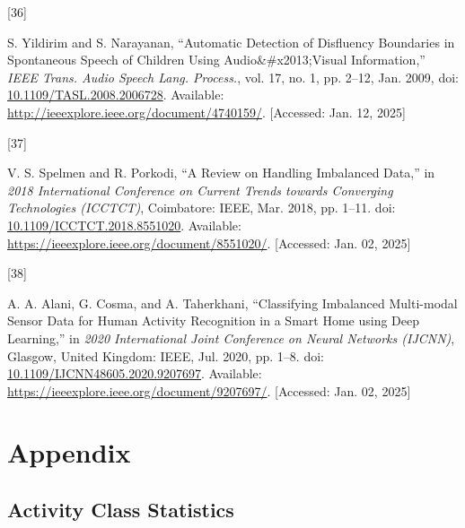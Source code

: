 \documentclass[
  man,floatsintext]{apa6}
\newlength{\cslhangindent}
\newlength{\csllabelwidth}
\newenvironment{CSLReferences}[2] %
 {\begin{list}{}{%
  \setlength{\itemindent}{0pt}
  \setlength{\leftmargin}{0pt}
  \setlength{\parsep}{0pt}
  \ifodd #1
   \setlength{\leftmargin}{\cslhangindent}
   \setlength{\itemindent}{-1\cslhangindent}
  \fi
  \setlength{\itemsep}{#2\baselineskip}}}
 {\end{list}}
\newcommand{\CSLLeftMargin}[1]{\parbox[t]{\csllabelwidth}{\strut#1\strut}}
\newcommand{\CSLRightInline}[1]{\parbox[t]{\linewidth - \csllabelwidth}{\strut#1\strut}}
\begin{document}
\begin{CSLReferences}{0}{0}
\CSLLeftMargin{{[}36{]} }%
\CSLRightInline{S. Yildirim and S. Narayanan, {``Automatic {Detection} of {Disfluency Boundaries} in {Spontaneous Speech} of {Children Using Audio}\&\#x2013;{Visual Information},''} \emph{IEEE Trans. Audio Speech Lang. Process.}, vol. 17, no. 1, pp. 2--12, Jan. 2009, doi: \href{https://doi.org/10.1109/TASL.2008.2006728}{10.1109/TASL.2008.2006728}. Available: \url{http://ieeexplore.ieee.org/document/4740159/}. {[}Accessed: Jan. 12, 2025{]}}

\CSLLeftMargin{{[}37{]} }%
\CSLRightInline{V. S. Spelmen and R. Porkodi, {``A {Review} on {Handling Imbalanced Data},''} in \emph{2018 {International Conference} on {Current Trends} towards {Converging Technologies} ({ICCTCT})}, Coimbatore: IEEE, Mar. 2018, pp. 1--11. doi: \href{https://doi.org/10.1109/ICCTCT.2018.8551020}{10.1109/ICCTCT.2018.8551020}. Available: \url{https://ieeexplore.ieee.org/document/8551020/}. {[}Accessed: Jan. 02, 2025{]}}

\CSLLeftMargin{{[}38{]} }%
\CSLRightInline{A. A. Alani, G. Cosma, and A. Taherkhani, {``Classifying {Imbalanced Multi-modal Sensor Data} for {Human Activity Recognition} in a {Smart Home} using {Deep Learning},''} in \emph{2020 {International Joint Conference} on {Neural Networks} ({IJCNN})}, Glasgow, United Kingdom: IEEE, Jul. 2020, pp. 1--8. doi: \href{https://doi.org/10.1109/IJCNN48605.2020.9207697}{10.1109/IJCNN48605.2020.9207697}. Available: \url{https://ieeexplore.ieee.org/document/9207697/}. {[}Accessed: Jan. 02, 2025{]}}

\end{CSLReferences}

\endgroup

\newpage

\section{Appendix}\label{appendix}

\subsection{Activity Class Statistics}\label{activity-class-statistics}
\end{document}
